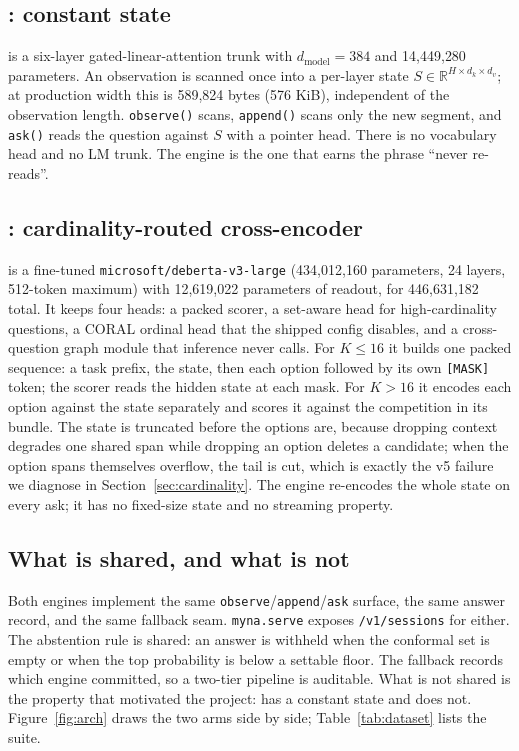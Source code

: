 \subsection{\stream{}: constant state}
\stream{} is a six-layer gated-linear-attention trunk with $d_{\text{model}}=384$ and 14{,}449{,}280 parameters. An observation is scanned once into a per-layer state $S\in\mathbb{R}^{H\times d_k\times d_v}$; at production width this is 589{,}824 bytes (576 KiB), independent of the observation length. \texttt{observe()} scans, \texttt{append()} scans only the new segment, and \texttt{ask()} reads the question against $S$ with a pointer head. There is no vocabulary head and no LM trunk. The engine is the one that earns the phrase “never re-reads”.

\subsection{\vsix{}: cardinality-routed cross-encoder}
\vsix{} is a fine-tuned \texttt{microsoft/deberta-v3-large} (434{,}012{,}160 parameters, 24 layers, 512-token maximum) with 12{,}619{,}022 parameters of readout, for 446{,}631{,}182 total. It keeps four heads: a packed scorer, a set-aware head for high-cardinality questions, a CORAL ordinal head that the shipped config disables, and a cross-question graph module that inference never calls. For $K\le16$ it builds one packed sequence: a task prefix, the state, then each option followed by its own \texttt{[MASK]} token; the scorer reads the hidden state at each mask. For $K>16$ it encodes each option against the state separately and scores it against the competition in its bundle. The state is truncated before the options are, because dropping context degrades one shared span while dropping an option deletes a candidate; when the option spans themselves overflow, the tail is cut, which is exactly the v5 failure we diagnose in Section~\ref{sec:cardinality}. The engine re-encodes the whole state on every ask; it has no fixed-size state and no streaming property.

\subsection{What is shared, and what is not}
Both engines implement the same \texttt{observe}/\texttt{append}/\texttt{ask} surface, the same answer record, and the same fallback seam. \texttt{myna.serve} exposes \texttt{/v1/sessions} for either. The abstention rule is shared: an answer is withheld when the conformal set is empty or when the top probability is below a settable floor. The fallback records which engine committed, so a two-tier pipeline is auditable. What is not shared is the property that motivated the project: \stream{} has a constant state and \vsix{} does not. Figure~\ref{fig:arch} draws the two arms side by side; Table~\ref{tab:dataset} lists the suite.

